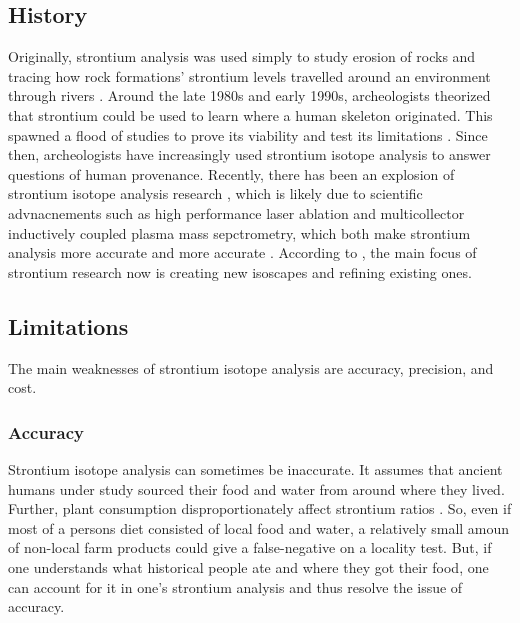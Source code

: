 \documentclass[a4paper, 12pt]{article}
\begin{document}
\subsection{History}
Originally, strontium analysis was used simply to study erosion of rocks and
tracing how rock formations' strontium levels travelled around an environment
through rivers \citep{crowley2017}. Around the late 1980s and early 1990s, archeologists theorized
that strontium could be used to learn where a human skeleton originated. This spawned
a flood of studies to prove its viability and test its limitations \citep{crowley2017}.
Since then, archeologists have increasingly used strontium isotope analysis to answer
questions of human provenance. Recently, there has been an explosion of strontium
isotope analysis research \citep{crowley2017}, which is likely due to scientific
advnacnements such as high performance laser ablation and multicollector inductively coupled
plasma mass sepctrometry, which both make strontium analysis more accurate and more accurate \citep{holt2021}.
According to \cite{holt2021}, the main focus of strontium research now is creating new isoscapes
and refining existing ones.




\subsection{Limitations}
The main weaknesses of strontium isotope analysis are accuracy, precision, and cost.
\subsubsection{Accuracy}
Strontium isotope analysis can sometimes be inaccurate. It assumes that ancient
humans under study sourced their food and water from around where they lived. Further,
plant consumption disproportionately affect strontium ratios \citep{price2006}. So, even if most of a
persons diet consisted of local food and water, a relatively
small amoun of non-local farm products could give a false-negative on a locality test.
But, if one understands what historical people ate and where they got their food,
one can account for it in one's strontium analysis and thus resolve the issue of accuracy.
\end{document}

